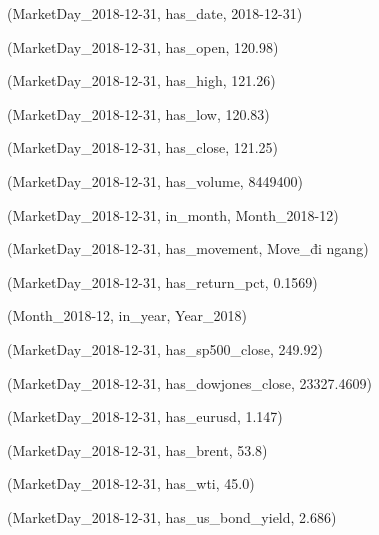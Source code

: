 (MarketDay\_2018-12-31, has\_date, 2018-12-31)\par
(MarketDay\_2018-12-31, has\_open, 120.98)\par
(MarketDay\_2018-12-31, has\_high, 121.26)\par
(MarketDay\_2018-12-31, has\_low, 120.83)\par
(MarketDay\_2018-12-31, has\_close, 121.25)\par
(MarketDay\_2018-12-31, has\_volume, 8449400)\par
(MarketDay\_2018-12-31, in\_month, Month\_2018-12)\par
(MarketDay\_2018-12-31, has\_movement, Move\_đi ngang)\par
(MarketDay\_2018-12-31, has\_return\_pct, 0.1569)\par
(Month\_2018-12, in\_year, Year\_2018)\par
(MarketDay\_2018-12-31, has\_sp500\_close, 249.92)\par
(MarketDay\_2018-12-31, has\_dowjones\_close, 23327.4609)\par
(MarketDay\_2018-12-31, has\_eurusd, 1.147)\par
(MarketDay\_2018-12-31, has\_brent, 53.8)\par
(MarketDay\_2018-12-31, has\_wti, 45.0)\par
(MarketDay\_2018-12-31, has\_us\_bond\_yield, 2.686)\par

